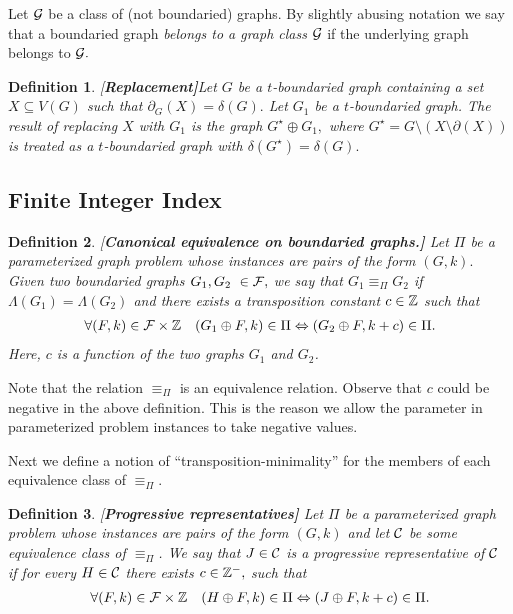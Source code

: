 \documentclass[11pt]{article}
\newtheorem{definition}{Definition}
\newcommand{\term}[1]{#1}
\begin{document}
Let ${\cal G}$ be a class of (not boundaried)  graphs.
By slightly abusing notation we say that a boundaried graph {\em belongs to a graph class ${\cal G}$} if the underlying graph belongs to ${\cal G}.$


\begin{definition}{\rm [\bf Replacement]}\label{defn:replacement}
Let $G$ be a $t$-boundaried graph containing a set $X\subseteq V(G)$
such that $\partial_{G}(X)=\delta(G).$ Let $G_1$ be a $t$-boundaried graph. The result of {\em replacing $X$ with $G_1$} is the graph $G^{\star}\oplus G_{1},$
where $G^{\star}=G\setminus (X\setminus \partial (X))$ is treated as a $t$-boundaried graph with  $\delta(G^{\star})=\delta(G).$
\end{definition}













\subsection{Finite Integer Index}
\label{subsec:finiinteginde}
\begin{definition}{\rm [\bf Canonical equivalence on boundaried graphs.]}
Let $\Pi$ be a parameterized graph problem whose instances are pairs of the form $(G,k).$
 Given two boundaried graphs $G_1,G_2~\in {\cal F},$ we say that \term{$G_1\!\equiv _{\Pi}\! G_2$} if 
$\Lambda(G_{1})=\Lambda(G_{2})$
 and there exists a \term{{\em transposition constant}}
$c\in\Bbb{Z}$ such that 
\begin{eqnarray*}
\forall(F,k)\in {\cal F}\times \Bbb{Z} &&  (G_1 \oplus F, k) \in \Pi \Leftrightarrow (G_2 \oplus F, k+c) \in \Pi.\label{eq:fiidef}
\end{eqnarray*}
Here, $c$ is a function of the two graphs $G_1$ and $G_2$. 
\end{definition}
Note that  the relation $\equiv_{\Pi}$  is
an equivalence relation. Observe that $c$ could be negative in the above definition. This is the reason we allow the parameter in parameterized problem instances to take negative values.  


Next  we define a notion of ``transposition-minimality'' for the members 
of  each equivalence class of $\equiv_{\Pi}.$


\begin{definition}{\rm [\bf Progressive representatives]}
\label{def:progrepr}
Let $\Pi$ be a parameterized graph problem whose instances are pairs of the form $(G,k)$
and let ${\cal C}$ be some equivalence class of $\equiv_{\Pi}$. We say that $J\in{\cal C}$ is a \term{{\em progressive 
representative}}
of ${\cal C}$ if for every $H\in{\cal C}$
there exists $c\in\Bbb{Z}^{-},$ such that 
\begin{eqnarray}
\forall(F,k)\in {\cal F}\times \Bbb{Z} \ \ \  (H \oplus F, k) \in \Pi \Leftrightarrow (J\oplus F, k+c) \in \Pi. \label{eq:progfii}
\end{eqnarray}
\end{definition}
\end{document}
